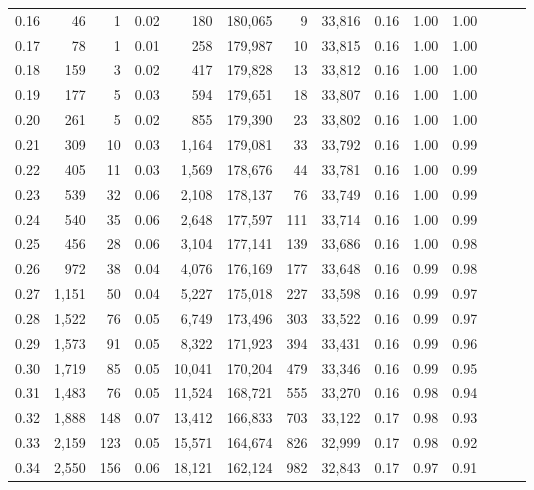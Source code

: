 \begin{tabular}{rrrrrrrrrrrrrr}
0.16 &     46 &      1 &  0.02 &      180 &  180,065 &       9 &  33,816 &  0.16 &  1.00 &      1.00 \\
0.17 &     78 &      1 &  0.01 &      258 &  179,987 &      10 &  33,815 &  0.16 &  1.00 &      1.00 \\
0.18 &    159 &      3 &  0.02 &      417 &  179,828 &      13 &  33,812 &  0.16 &  1.00 &      1.00 \\
0.19 &    177 &      5 &  0.03 &      594 &  179,651 &      18 &  33,807 &  0.16 &  1.00 &      1.00 \\
0.20 &    261 &      5 &  0.02 &      855 &  179,390 &      23 &  33,802 &  0.16 &  1.00 &      1.00 \\
0.21 &    309 &     10 &  0.03 &    1,164 &  179,081 &      33 &  33,792 &  0.16 &  1.00 &      0.99 \\
0.22 &    405 &     11 &  0.03 &    1,569 &  178,676 &      44 &  33,781 &  0.16 &  1.00 &      0.99 \\
0.23 &    539 &     32 &  0.06 &    2,108 &  178,137 &      76 &  33,749 &  0.16 &  1.00 &      0.99 \\
0.24 &    540 &     35 &  0.06 &    2,648 &  177,597 &     111 &  33,714 &  0.16 &  1.00 &      0.99 \\
0.25 &    456 &     28 &  0.06 &    3,104 &  177,141 &     139 &  33,686 &  0.16 &  1.00 &      0.98 \\
0.26 &    972 &     38 &  0.04 &    4,076 &  176,169 &     177 &  33,648 &  0.16 &  0.99 &      0.98 \\
0.27 &  1,151 &     50 &  0.04 &    5,227 &  175,018 &     227 &  33,598 &  0.16 &  0.99 &      0.97 \\
0.28 &  1,522 &     76 &  0.05 &    6,749 &  173,496 &     303 &  33,522 &  0.16 &  0.99 &      0.97 \\
0.29 &  1,573 &     91 &  0.05 &    8,322 &  171,923 &     394 &  33,431 &  0.16 &  0.99 &      0.96 \\
0.30 &  1,719 &     85 &  0.05 &   10,041 &  170,204 &     479 &  33,346 &  0.16 &  0.99 &      0.95 \\
0.31 &  1,483 &     76 &  0.05 &   11,524 &  168,721 &     555 &  33,270 &  0.16 &  0.98 &      0.94 \\
0.32 &  1,888 &    148 &  0.07 &   13,412 &  166,833 &     703 &  33,122 &  0.17 &  0.98 &      0.93 \\
0.33 &  2,159 &    123 &  0.05 &   15,571 &  164,674 &     826 &  32,999 &  0.17 &  0.98 &      0.92 \\
0.34 &  2,550 &    156 &  0.06 &   18,121 &  162,124 &     982 &  32,843 &  0.17 &  0.97 &      0.91 \\

\end{tabular}
